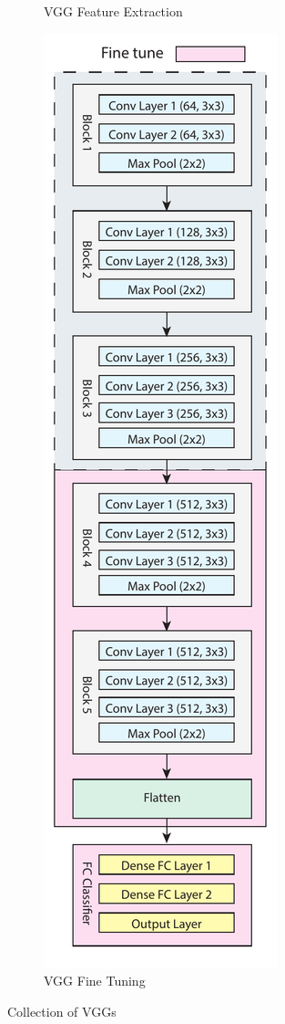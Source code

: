 \documentclass[a4paper, twocolumn]{article}
\begin{document}
\begin{figure}
\begin{subfigure}{0.16\textwidth}
		\caption{VGG Feature Extraction }
		\label{fig:vgg2}
	\end{subfigure}%
	\begin{subfigure}{0.16\textwidth}
		\includegraphics[width=\linewidth]{Figures/vgg_architecture_fine}
		\caption{VGG Fine Tuning}
		\label{fig:vgg3}
	\end{subfigure}%
	\caption{Collection of VGGs}
	\label{fig:vgg_overall}
\end{figure}
\end{document}

